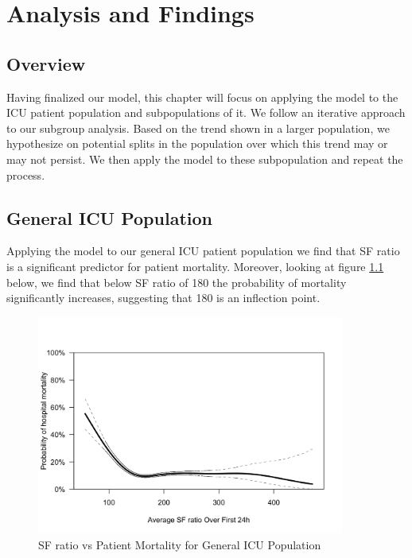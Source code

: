
\chapter{Analysis and Findings} %

\label{Chapter5} %

\section{Overview}

Having finalized our model, this chapter will focus on applying the model to the ICU patient population and subpopulations of it. We follow an iterative approach to our subgroup analysis. Based on the trend shown in a larger population, we hypothesize on potential splits in the population over which this trend may or may not persist. We then apply the model to these subpopulation and repeat the process. 

\section{General ICU Population}

Applying the model to our general ICU patient population we find that SF ratio is a significant predictor for patient mortality. Moreover, looking at figure \ref{fig:results_general} below, we find that below SF ratio of 180 the probability of mortality significantly increases, suggesting that 180 is an inflection point. 


\begin{figure}[H]
	\centering
	\includegraphics[width=0.9\textwidth]{figures/results_general-1.png}
	\caption{SF ratio vs Patient Mortality for General ICU Population} 
	\label{fig:results_general}
\end{figure}

